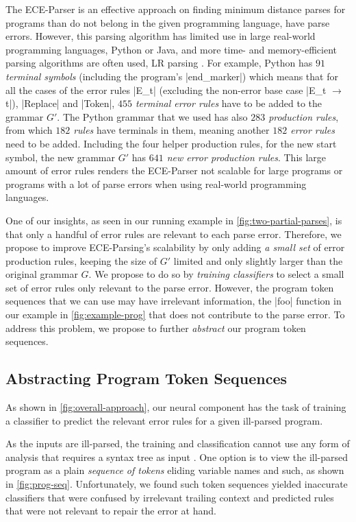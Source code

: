 The ECE-Parser is an effective approach on finding minimum distance parses for
programs than do not belong in the given programming language, \ie have parse
errors. However, this parsing algorithm has limited use in large real-world
programming languages, \eg Python or Java, and more time- and memory-efficient
parsing algorithms are often used, \eg LR parsing \etc \citep{Knuth_1965,
Chapman_1987}. For example, Python has \emph{$91$ terminal symbols} (including
the program's |end_marker|) which means that for all the cases of the error
rules |E_t| (excluding the non-error base case |E_t $\rightarrow$ t|), |Replace|
and |Token|, \emph{$455$ terminal error rules} have to be added to the grammar
$G'$. The Python grammar that we used has also \emph{$283$ production rules},
from which \emph{$182$ rules} have terminals in them, meaning another
\emph{$182$ error rules} need to be added. Including the four helper production
rules, \eg for the new start symbol, the new grammar $G'$ has \emph{$641$ new
error production rules}. This large amount of error rules renders the ECE-Parser
not scalable for large programs or programs with a lot of parse errors when
using real-world programming languages.

One of our insights,
as seen in our running example in \autoref{fig:two-partial-parses}, is that only
a handful of error rules are relevant to each parse error. Therefore, we
propose to improve ECE-Parsing's scalability by only adding \emph{a
small set} of error production rules, \ie keeping the size of $G'$ limited and
only slightly larger than the original grammar $G$. We propose to do so by
\emph{training classifiers} to select a small set of error rules only relevant
to the parse error. However, the program token sequences that we can use
may have irrelevant information, \eg the |foo| function in our example in
\autoref{fig:example-prog} that does not contribute to the parse error. To
address this problem, we propose to further \emph{abstract} our program token
sequences.

\subsection{Abstracting Program Token Sequences}
\label{sec:overview:abstraction}

As shown in \autoref{fig:overall-approach}, our neural component has the task of
training a classifier to predict the relevant error rules for a given ill-parsed
program.

%
As the inputs are ill-parsed, the training and classification
cannot use any form of analysis that requires a syntax tree as
input \citep{Sakkas_2020, Martinez_2013, Gulwani_2018, Wang_2018}.
%
One option is to view the ill-parsed program as a
plain \emph{sequence of tokens} eliding variable
names and such, as shown in \autoref{fig:prog-seq}.
%
Unfortunately, we found such token sequences yielded inaccurate classifiers that
were confused by irrelevant trailing context and predicted rules that were not
relevant to repair the error at hand.


